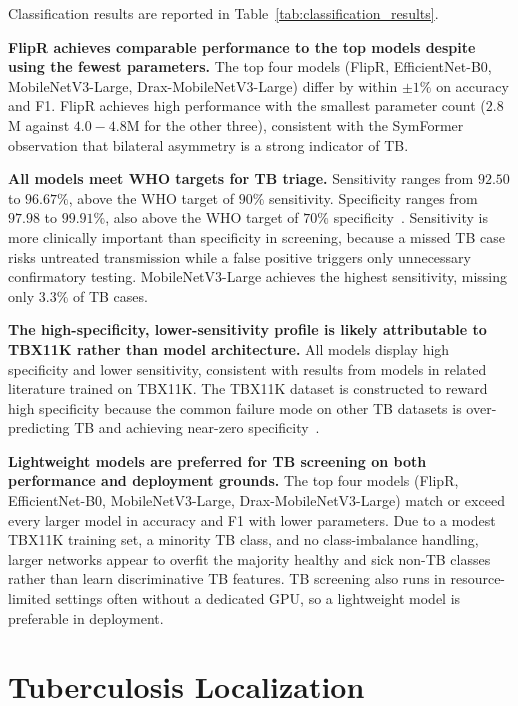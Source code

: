 \documentclass[conference, letterpaper]{IEEEtran}
\begin{document}
Classification results are reported in Table~\ref{tab:classification_results}.

\textbf{FlipR achieves comparable performance to the top models despite using the fewest parameters.} The top four models (FlipR, EfficientNet-B0, MobileNetV3-Large, Drax-MobileNetV3-Large) differ by within $\pm 1\%$ on accuracy and F1. FlipR achieves high performance with the smallest parameter count ($2.8$M against $4.0-4.8$M for the other three), consistent with the SymFormer~\cite{liu2023tbx11k_pami} observation that bilateral asymmetry is a strong indicator of TB.

\textbf{All models meet WHO targets for TB triage.}
Sensitivity ranges from $92.50$ to $96.67\%$, above the WHO target of $90\%$ sensitivity. Specificity ranges from $97.98$ to $99.91\%$, also above the WHO target of $70\%$ specificity~\cite{who_screening_2021}. Sensitivity is more clinically important than specificity in screening, because a missed TB case risks untreated transmission while a false positive triggers only unnecessary confirmatory testing. MobileNetV3-Large achieves the highest sensitivity, missing only $3.3\%$ of TB cases.

\textbf{The high-specificity, lower-sensitivity profile is likely attributable to TBX11K rather than model architecture.}
All models display high specificity and lower sensitivity, consistent with results from models in related literature trained on TBX11K. The TBX11K dataset is constructed to reward high specificity because the common failure mode on other TB datasets is over-predicting TB and achieving near-zero specificity~\cite{liu2023tbx11k_pami}.

\textbf{Lightweight models are preferred for TB screening on both performance and deployment grounds.}
The top four models (FlipR, EfficientNet-B0, MobileNetV3-Large, Drax-MobileNetV3-Large) match or exceed every larger model in accuracy and F1 with lower parameters. Due to a modest TBX11K training set, a minority TB class, and no class-imbalance handling, larger networks appear to overfit the majority healthy and sick non-TB classes rather than learn discriminative TB features. TB screening also runs in resource-limited settings often without a dedicated GPU, so a lightweight model is preferable in deployment.

\section{Tuberculosis Localization}
\label{sec:tb_localization}
\end{document}
